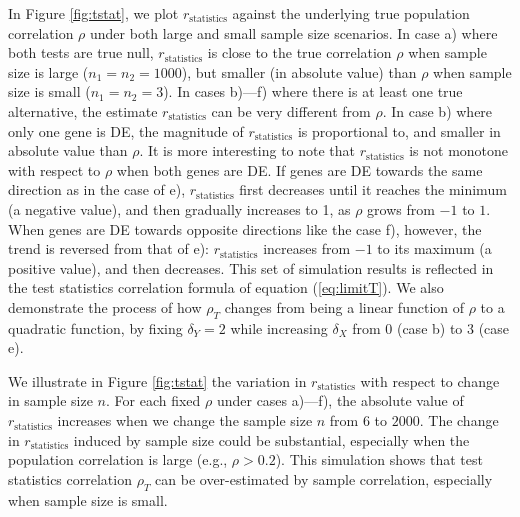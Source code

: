 	In Figure \ref{fig:tstat}, we plot $r_\text{statistics}$ against the 
	underlying true population correlation $\rho$ under both large and small sample size scenarios. 
	In case a) where both tests are true null, $r_\text{statistics}$ is close to the true 
	correlation $\rho$ when sample size is large ($n_1 = n_2 = 1000$), but smaller (in absolute 
	value) than $\rho$ when sample size is small ($n_1 = n_2 = 3$).
	In cases b)---f) where there is at least one true alternative, the estimate
	$r_\text{statistics}$ can be very 
	different from $\rho$. In case b) where only one gene is DE, 
	the magnitude of $r_\text{statistics}$ is proportional to, and smaller in absolute value than 
	$\rho$.
	It is more interesting to note that $r_\text{statistics}$ is not monotone with respect to 
	$\rho$ when both genes are DE. If genes are DE towards the same direction as in the case of 
	e),  $r_\text{statistics}$ first decreases until it reaches the minimum (a negative value), and 
	then gradually increases to 1, as 
	$\rho$ grows from $-1$ to $1$. When genes are DE towards opposite directions like the case f), 
	however, the trend is reversed from that of e): $r_\text{statistics}$ increases from $-1$ to 
	its maximum (a positive value), and then decreases. 
	This set of simulation results is reflected in the test statistics correlation formula of 
	equation (\ref{eq:limitT}). We also demonstrate the process of how $\rho_T$ changes from
	being a linear function of $\rho$ to a quadratic function, by fixing $\delta_Y=2$ while 
	increasing $\delta_X$ from $0$ (case b) to $3$ (case e).
	
	We illustrate in Figure \ref{fig:tstat} the variation in $r_\text{statistics}$ with 
	respect to change in sample size $n$. For each fixed $\rho$ under cases a)---f), the absolute 
	value of $r_\text{statistics}$  increases when we change the sample size $n$ from $6$ to 
	$2000$. The change in $r_\text{statistics}$ induced by sample size could be substantial, 
	especially when the population correlation is large (e.g., $\rho > 0.2$). This simulation shows 
	that test statistics correlation $\rho_T$ can be over-estimated by sample correlation, 
	especially when sample size is small.
	
